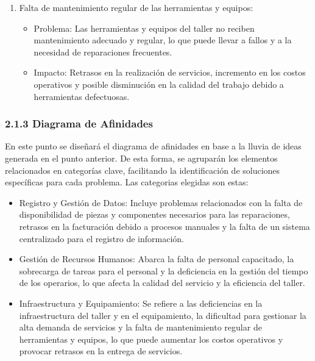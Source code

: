 \begin{enumerate}
    \item Falta de mantenimiento regular de las herramientas y equipos:
    \begin{itemize}
        \item Problema: Las herramientas y equipos del taller no reciben mantenimiento adecuado y regular, lo que puede llevar a fallos y a la necesidad de reparaciones frecuentes.
        \item Impacto: Retrasos en la realización de servicios, incremento en los costos operativos y posible disminución en la calidad del trabajo debido a herramientas defectuosas.    
    \end{itemize}    
\end{enumerate}

\subsubsection*{2.1.3 Diagrama de Afinidades}
En este punto se diseñará el diagrama de afinidades en base a la lluvia de ideas generada en el punto anterior. De esta forma, se agruparán los elementos relacionados en categorías clave, facilitando la identificación de soluciones específicas para cada problema. Las categorias elegidas son estas:%
\begin{itemize}
    \item Registro y Gestión de Datos: Incluye problemas relacionados con la falta de disponibilidad de piezas y componentes necesarios para las reparaciones, retrasos en la facturación debido a procesos manuales y la falta de un sistema centralizado para el registro de información.
    \item Gestión de Recursos Humanos: Abarca la falta de personal capacitado, la sobrecarga de tareas para el personal y la deficiencia en la gestión del tiempo de los operarios, lo que afecta la calidad del servicio y la eficiencia del taller.
    \item Infraestructura y Equipamiento: Se refiere a las deficiencias en la infraestructura del taller y en el equipamiento, la dificultad para gestionar la alta demanda de servicios y la falta de mantenimiento regular de herramientas y equipos, lo que puede aumentar los costos operativos y provocar retrasos en la entrega de servicios.
\end{itemize}


